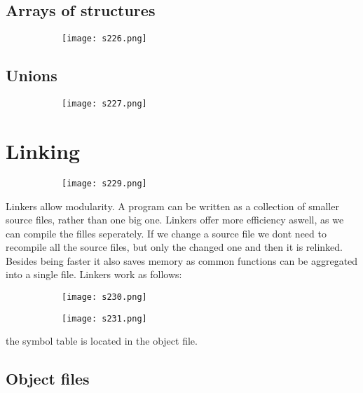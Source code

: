 \documentclass[8pt]{extreport}
\begin{document}
\section{Arrays of structures}
\begin{figure}[H]
\centering
\begin{subfigure}[b]{0.4\linewidth}
\texttt{[image: s226.png]}
\end{subfigure}
\end{figure}
\section{Unions}
\begin{figure}[H]
\centering
\begin{subfigure}[b]{0.4\linewidth}
\texttt{[image: s227.png]}
\end{subfigure}
\end{figure}

\chapter{Linking}
\begin{figure}[H]
\centering
\begin{subfigure}[b]{0.4\linewidth}
\texttt{[image: s229.png]}
\end{subfigure}
\end{figure}
Linkers allow modularity. A program can be written as a collection of smaller source files, rather than one big one. Linkers offer more efficiency aswell, as we can compile the filles seperately. If we change a source file we dont need to recompile all the source files, but only the changed one and then it is relinked. Besides being faster it also saves memory as common functions can be aggregated into a single file. Linkers work as follows:
\begin{figure}[H]
\centering
\begin{subfigure}[b]{0.4\linewidth}
\texttt{[image: s230.png]}
\end{subfigure}
\begin{subfigure}[b]{0.4\linewidth}
\texttt{[image: s231.png]}
\end{subfigure}
\end{figure}
the symbol table is located in the object file.

\section{Object files}
\end{document}
